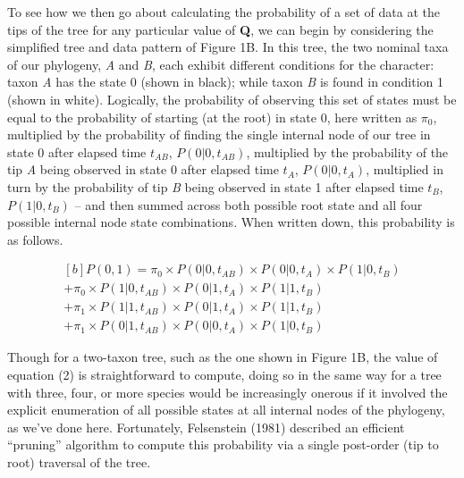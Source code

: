 \documentclass[fleqn,10pt,lineno]{wlpeerj} %
\begin{document}
To see how we then go about calculating the probability of a set of data at the tips of the tree for any particular value of \textbf{Q}, we can begin by considering the simplified tree and data pattern of Figure 1B. In this tree, the two nominal taxa of our phylogeny, \emph{A} and \emph{B}, each exhibit different conditions for the character: taxon \emph{A} has the state 0 (shown in black); while taxon \emph{B} is found in condition 1 (shown in white). Logically, the probability of observing this set of states must be equal to the probability of starting (at the root) in state 0, here written as \(\pi_{0}\), multiplied by the probability of finding the single internal node of our tree in state 0 after elapsed time \(t_{AB}\), \(P(0 | 0, t_{AB})\), multiplied by the probability of the tip \emph{A} being observed in state 0 after elapsed time \(t_{A}\), \(P(0 | 0, t_{A})\), multiplied in turn by the probability of tip \emph{B} being observed in state 1 after elapsed time \(t_{B}\), \(P(1 | 0, t_{B})\) -- and then summed across both possible root state and all four possible internal node state combinations. When written down, this probability is as follows.

\begin{equation}
\begin{aligned}[b]
P(0 , 1) = \pi_{0} \times P(0 | 0, t_{AB}) \times P(0 | 0, t_{A}) \times P(1 | 0, t_{B})\\ 
+ \pi_{0} \times P(1 | 0, t_{AB}) \times P(0 | 1, t_{A}) \times P(1 | 1, t_{B})\\ 
+ \pi_{1} \times P(1 | 1, t_{AB}) \times P(0 | 1, t_{A}) \times P(1 | 1, t_{B})\\ 
+ \pi_{1} \times P(0 | 1, t_{AB}) \times P(0 | 0, t_{A}) \times P(1 | 0, t_{B})
\end{aligned}
\end{equation}

Though for a two-taxon tree, such as the one shown in Figure 1B, the value of equation (2) is straightforward to compute, doing so in the same way for a tree with three, four, or more species would be increasingly onerous if it involved the explicit enumeration of all possible states at all internal nodes of the phylogeny, as we've done here. Fortunately, Felsenstein (1981) described an efficient ``pruning'' algorithm to compute this probability via a single post-order (tip to root) traversal of the tree.
\end{document}
